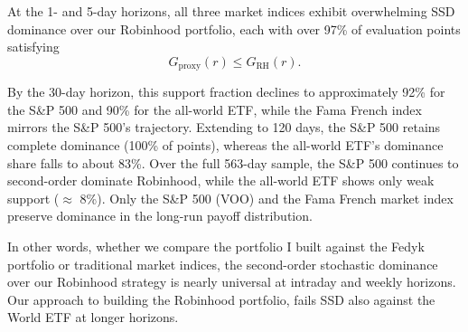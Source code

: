 At the 1- and 5-day horizons, all three market indices exhibit overwhelming SSD dominance over our Robinhood portfolio, each with over 97\% of evaluation points satisfying
\begin{equation}
    G_{\mathrm{proxy}}(r) \leq G_{\mathrm{RH}}(r).
\end{equation}

By the 30-day horizon, this support fraction declines to approximately 92\% for the S\&P 500 and 90\% for the all-world ETF, while the Fama French index mirrors the S\&P 500's trajectory. 
Extending to 120 days, the S\&P 500 retains complete dominance (100\% of points), whereas the all-world ETF's dominance share falls to about 83\%. 
Over the full 563-day sample, the S\&P 500 continues to second-order dominate Robinhood, while the all-world ETF shows only weak support ($\approx$ 8\%).
Only the S\&P 500 (VOO) and the Fama French market index preserve dominance in the long-run payoff distribution.

In other words, whether we compare the portfolio I built against the Fedyk portfolio or traditional market indices, the second-order stochastic dominance over our Robinhood strategy is nearly universal at intraday and weekly horizons. 
Our approach to building the Robinhood portfolio, fails SSD also against the World ETF at longer horizons.

